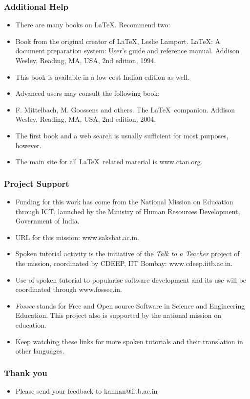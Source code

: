 \documentclass[blue]{beamer}
\begin{document}
\begin{frame}
\frametitle{Additional Help}
\begin{itemize}
\item<+-|alert@+> There are many books on \LaTeX.  Recommend two: 
\item<+-|alert@+> Book from the original creator of \LaTeX,
  Leslie Lamport.  {\color{magenta} \LaTeX: A document
    preparation system: User's guide and reference manual.}
  Addison Wesley, Reading, MA, USA, 2nd edition, 1994.
\item<+-|alert@+> This book is available in a low cost Indian
  edition as well.
\item<+-|alert@+> Advanced users may consult the following book:
\item<+-|alert@+> F. Mittelbach, M. Goossens and others.
  {\color{magenta} The \LaTeX\ companion.} Addison
    Wesley, Reading, MA, USA, 2nd edition, 2004.
\item<+-|alert@+> The first book and a web search is usually
  sufficient for most purposes, however.
\item<+-|alert@+> The main site for all \LaTeX\ related material
  is {\color{magenta}www.ctan.org.}
\end{itemize}
\end{frame}

\begin{frame}
\frametitle{Project Support}
\begin{itemize}
\item<+-|alert@+> Funding for this work has come from the
  {\color{magenta} National Mission on Education through ICT},
  launched by the Ministry of Human Resources Development,
  Government of India.
\item<+-|alert@+> URL for this mission: {\color{magenta}
    www.sakshat.ac.in}.
\item<+-|alert@+> Spoken tutorial activity is the initiative of
  the \emph{Talk to a Teacher} project of the mission,
  coordinated by CDEEP, IIT Bombay: {\color{magenta}
    www.cdeep.iitb.ac.in}. 
\item<+-|alert@+> Use of spoken tutorial
  to popularise software development and its use will be
  coordinated through {\color{magenta} www.fossee.in}.
\item<+-|alert@+> \emph{Fossee} stands for Free and Open source
  Software in Science and Engineering Education.  This project
  also is supported by the national mission on education.
\item<+-|alert@+> Keep watching these links for more spoken
  tutorials and their translation in other languages.
\end{itemize}
\end{frame}

\begin{frame}
\frametitle{Thank you}
\begin{itemize}
\item Please send your feedback to kannan@iitb.ac.in
\end{itemize}
\end{frame}
\end{document}
